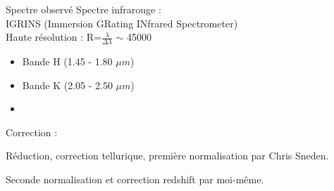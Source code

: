 \documentclass[10pt]{beamer}
\begin{document}
\begin{frame}[fragile]{Spectre observé}
             Spectre infrarouge : \\
             IGRINS (Immersion GRating INfrared Spectrometer) \\ 
             Haute résolution : R=$\frac{\lambda}{\Delta \lambda}$ $\sim$ 45000 \\
    					\begin{itemize}
    						\item Bande H (1.45 - 1.80 $\mu m$)
    						\item Bande K (2.05 - 2.50 $\mu m$)
    						\item[]
    					\end{itemize}
        \vfill
        Correction : 

        Réduction, correction tellurique, première normalisation par Chris Sneden. 
        
        Seconde normalisation et correction redshift par moi-même. \\
\end{frame}
\end{document}
